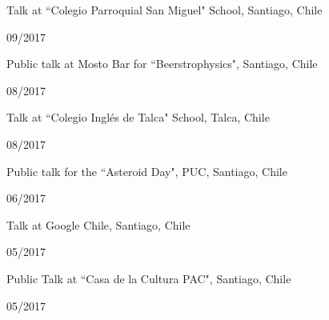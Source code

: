 \documentclass[12pt, a4paper]{article} %
\begin{document}
\begin{minipage}[t]{0.7\textwidth}
\begin{flushleft}%
  \setlength{\leftskip}{0.2cm}%
Talk at ``Colegio Parroquial San Miguel" School, Santiago, Chile
\end{flushleft}
\end{minipage}
\begin{minipage}[t]{0.3\textwidth}
\hfill 09/2017
\end{minipage}

\begin{minipage}[t]{0.7\textwidth}
\begin{flushleft}%
  \setlength{\leftskip}{0.2cm}%
Public talk at Mosto Bar for ``Beerstrophysics", Santiago, Chile
\end{flushleft}
\end{minipage}
\begin{minipage}[t]{0.3\textwidth}
\hfill 08/2017
\end{minipage}

\begin{minipage}[t]{0.7\textwidth}
\begin{flushleft}%
  \setlength{\leftskip}{0.2cm}%
Talk at ``Colegio Ingl\'es de Talca" School, Talca, Chile
\end{flushleft}
\end{minipage}
\begin{minipage}[t]{0.3\textwidth}
\hfill 08/2017
\end{minipage}

\begin{minipage}[t]{0.7\textwidth}
\begin{flushleft}%
  \setlength{\leftskip}{0.2cm}%
Public talk for the ``Asteroid Day", PUC, Santiago, Chile
\end{flushleft}
\end{minipage}
\begin{minipage}[t]{0.3\textwidth}
\hfill 06/2017
\end{minipage}

\begin{minipage}[t]{0.7\textwidth}
\begin{flushleft}%
  \setlength{\leftskip}{0.2cm}%
Talk at Google Chile, Santiago, Chile
\end{flushleft}
\end{minipage}
\begin{minipage}[t]{0.3\textwidth}
\hfill 05/2017
\end{minipage}

\begin{minipage}[t]{0.7\textwidth}
\begin{flushleft}%
  \setlength{\leftskip}{0.2cm}%
Public Talk at ``Casa de la Cultura PAC", Santiago, Chile
\end{flushleft}
\end{minipage}
\begin{minipage}[t]{0.3\textwidth}
\hfill 05/2017
\end{minipage}
\end{document}
